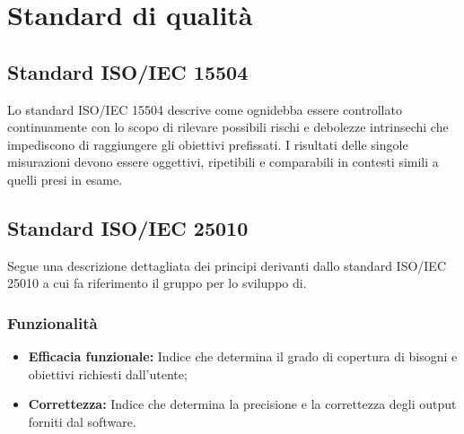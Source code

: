 \chapter{Standard di qualità}
\section{Standard ISO/IEC 15504}
Lo standard ISO/IEC 15504 descrive come ognidebba essere controllato continuamente con lo scopo di rilevare possibili rischi e debolezze intrinsechi che impediscono di raggiungere gli obiettivi prefissati. I risultati delle singole misurazioni devono essere oggettivi, ripetibili e comparabili in contesti simili a quelli presi in esame. 
\section{Standard ISO/IEC 25010}
Segue una descrizione dettagliata dei principi derivanti dallo standard ISO/IEC 25010 a cui fa riferimento il gruppo per lo sviluppo di.

\subsection{Funzionalità}
\begin{itemize}
	\item \textbf{Efficacia funzionale:} Indice che determina il grado di copertura di bisogni e obiettivi richiesti dall'utente;
	\item \textbf{Correttezza:} Indice che determina la precisione e la correttezza degli output forniti dal software.
\end{itemize}
